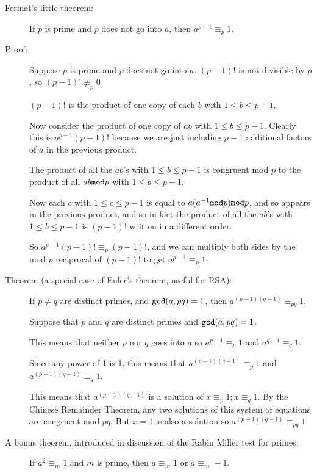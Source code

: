 \documentclass[12pt]{article}
\begin{document}
\begin{description}

\item[Fermat's little theorem:] If $p$ is prime and $p$ does not go into $a$, then $a^{p-1}\equiv_p 1$.
\item[Proof:]  Suppose $p$ is prime and $p$ does not go into $a$.  $(p-1)!$ is not divisible by $p$, so $(p-1)! \not\equiv_p0$

$(p-1)!$ is the product of one copy of each $b$ with $1 \leq b \leq p-1$.

Now consider the product of one copy of $ab$ with $1 \leq b \leq p-1$.  Clearly this is
$a^{p-1}(p-1)!$ because we are just including $p-1$ additional factors of $a$ in the previous product.

The product of all the $ab$'s with $1 \leq b \leq p-1$ is congruent mod $p$ to the product of all
$ab{\tt mod}p$ with $1 \leq b \leq p-1$.

Now each $c$ with $1 \leq c \leq p-1$ is equal to $a(a^{-1}{\tt mod}p) {\tt mod} p$, and so appears in the previous product, and so in fact the product of all the $ab$'s with $1 \leq b \leq p-1$ is $(p-1)!$ written in a different order.

So $a^{p-1}(p-1)! \equiv_p (p-1)!$, and we can multiply both sides by the mod $p$ reciprocal of $(p-1)!$ to
get $a^{p-1} \equiv_p 1$.




\item[Theorem (a special case of Euler's theorem, useful for RSA):]  If $p \neq q$ are distinct primes,
and ${\tt gcd}(a,pq)=1$, then $a^{(p-1)(q-1)} \equiv_{pq} 1$.

Suppose that $p$ and $q$ are distinct primes and ${\tt gcd}(a,pq)=1$.  

This means that neither $p$ nor $q$ goes into $a$ so $a^{p-1} \equiv_p 1$ and $a^{q-1} \equiv_q 1$.

Since any power of 1 is 1, this means that $a^{(p-1)(q-1)} \equiv_{p} 1$ and $a^{(p-1)(q-1)} \equiv_{q} 1$.

This means that $a^{(p-1)(q-1)}$ is a solution of $x \equiv_p 1;x \equiv_q 1$.  By the Chinese Remainder Theorem,
any two solutions of this system of equations are congruent mod $pq$.  But $x=1$ is also a solution so
$a^{(p-1)(q-1)} \equiv_{pq} 1$.

\item[A bonus theorem, introduced in discussion of the Rabin Miller test for primes:]  If $a^2 \equiv_m 1$
and $m$ is prime, then $a \equiv_m 1$ or $a \equiv_m -1$.


\end{description}
\end{document}
